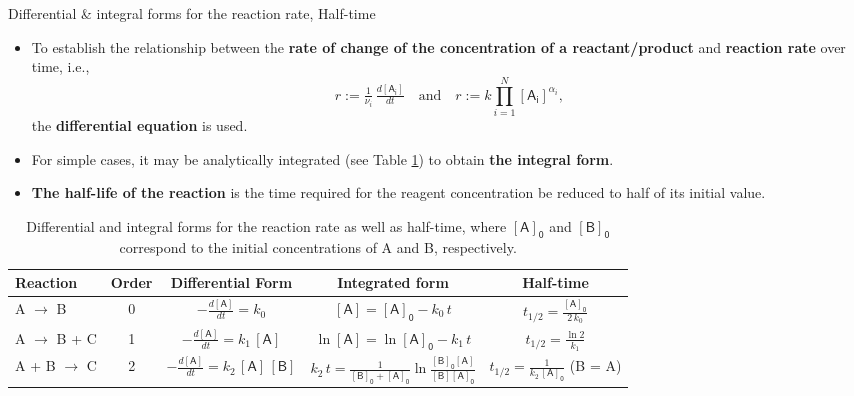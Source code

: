 \begin{frame}[<+->]{Differential \& integral forms for the reaction rate, Half-time}
%
\footnotesize
\begin{itemize}
	\item To establish the relationship between the {\bf rate of change of the concentration of a reactant/product}  and  {\bf reaction rate} over time, i.e., 
	$$r := \tfrac{1}{\nu_i}  \, \tfrac{d [ \mathsf{A_i}]}{dt} \quad \mbox{and} \quad 
		r := k \prod_{i=1}^{N} [\mathsf{A_i}]^{\alpha_i},$$
	the {\bf differential equation} is used.
	\item For simple cases, it may be analytically integrated (see Table \ref{tab:differential-integral-forms}) to obtain \alert{\bf the integral form}.
	\item \alert{\bf The half-life of the reaction} is the time required for the reagent concentration be reduced to half of its initial
value.
\end{itemize}
\begin{table}
\footnotesize
	\begin{tabular*}{1\textwidth}{@{\extracolsep{\fill}}lcccc}
		\toprule 
		Reaction & Order & Differential Form & Integrated form & Half-time \\[5pt]
		\midrule 
		A $\rightarrow$ B & 0 & $-\tfrac{d \mathsf{[A]}}{dt} = k_0$ & $\mathsf{[A]} = \mathsf{[A]_0} - k_0\,t$ & 
		$t_{1/2} = \tfrac{\mathsf{[A]_0}}{2\,k_0}$ \\[5pt]
		A $\rightarrow$ B + C & 1 & $-\tfrac{d \mathsf{[A]}}{dt} = k_1\, \mathsf{[A]}$ & $\ln \mathsf{[A]} = \ln \mathsf{[A]_0} - k_1\,t$ & $t_{1/2} = \tfrac{\ln 2}{k_1}$ \\[5pt]
		A + B  $\rightarrow$ C & 2 & $-\tfrac{d \mathsf{[A]}}{dt} = k_2\, \mathsf{[A]}\, \mathsf{[B]}$ & 
		$k_2\,t = \tfrac{1}{\mathsf{[B]_0} + \mathsf{[A]_0}} \ln \tfrac{\mathsf{[B]_0} \mathsf{[A]}}{\mathsf{[B]} \mathsf{[A]_0}}$ & $t_{1/2} = \tfrac{1}{k_2 \, \mathsf{[A]_0}}$ (B = A) \\[5pt]
		\bottomrule
	\end{tabular*}
	\caption{\label{tab:differential-integral-forms} \footnotesize Differential and integral forms for the reaction rate as well as half-time, where $\mathsf{[A]_0}$ and $\mathsf{[B]_0}$ correspond to the initial concentrations of A and B, respectively.}
\end{table}
%
\end{frame}
%
